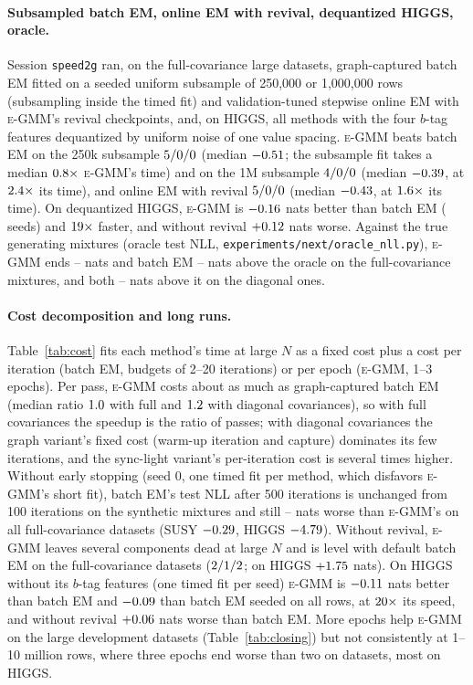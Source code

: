 \documentclass[10pt]{article} %
\newcommand{\egmm}{\textsc{e-GMM}}
\begin{document}
\paragraph{Subsampled batch EM, online EM with revival, dequantized HIGGS, oracle.} Session \texttt{speed2g} ran, on the full-covariance large datasets, graph-captured batch EM fitted on a seeded uniform subsample of 250{,}000 or 1{,}000{,}000 rows (subsampling inside the timed fit) and validation-tuned stepwise online EM with \egmm{}'s revival checkpoints, and, on HIGGS, all methods with the four $b$-tag features dequantized by uniform noise of one value spacing. \egmm{} beats batch EM on the 250k subsample $5/0/0$ (median $-0.51$; the subsample fit takes a median $0.8\times$ \egmm{}'s time) and on the 1M subsample $4/0/0$ (median $-0.39$, at $2.4\times$ its time), and online EM with revival $5/0/0$ (median $-0.43$, at $1.6\times$ its time). On dequantized HIGGS, \egmm{} is $-0.16$ nats better than batch EM (\rSDqSeedWins{} seeds) and $19\times$ faster, and without revival $+0.12$ nats worse. Against the true generating mixtures (oracle test NLL, \texttt{experiments/next/oracle\_nll.py}), \egmm{} ends \rSOrcFullEMin--\rSOrcFullEMax{} nats and batch EM \rSOrcFullBMin--\rSOrcFullBMax{} nats above the oracle on the full-covariance mixtures, and both \rSOrcDiagEMin--\rSOrcDiagEMax{} nats above it on the diagonal ones.

\paragraph{Cost decomposition and long runs.} Table~\ref{tab:cost} fits each method's time at large $N$ as a fixed cost plus a cost per iteration (batch EM, budgets of 2--20 iterations) or per epoch (\egmm{}, 1--3 epochs). Per pass, \egmm{} costs about as much as graph-captured batch EM (median ratio $1.0$ with full and $1.2$ with diagonal covariances), so with full covariances the speedup is the ratio of passes; with diagonal covariances the graph variant's fixed cost (warm-up iteration and capture) dominates its few iterations, and the sync-light variant's per-iteration cost is several times higher. Without early stopping (seed 0, one timed fit per method, which disfavors \egmm{}'s short fit), batch EM's test NLL after 500 iterations is unchanged from 100 iterations on the synthetic mixtures and still \rSLongMinGap{}--\rSLongMaxGap{} nats worse than \egmm{}'s on all \rSLongN{} full-covariance datasets (SUSY $-0.29$, HIGGS $-4.79$). Without revival, \egmm{} leaves several components dead at large $N$ and is level with default batch EM on the full-covariance datasets ($2/1/2$; on HIGGS $+1.75$ nats). On HIGGS without its $b$-tag features (one timed fit per seed) \egmm{} is $-0.11$ nats better than batch EM and $-0.09$ than batch EM seeded on all rows, at $20\times$ its speed, and without revival $+0.06$ nats worse than batch EM. More epochs help \egmm{} on the large development datasets (Table~\ref{tab:closing}) but not consistently at 1--10 million rows, where three epochs end worse than two on \rSLgEthreeWorse{} datasets, most on HIGGS.
\end{document}
